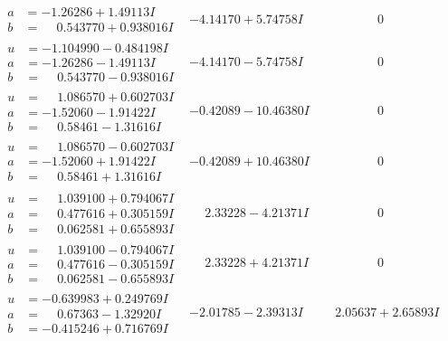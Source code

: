 \documentclass[1p]{elsarticle_modified}
\theoremstyle{definition}
\begin{document}
$$\begin{array}{c|c|c}
\begin{aligned}
a &= -1.26286 + 1.49113 I \\
b &= \phantom{-}0.543770 + 0.938016 I\end{aligned}
 & -4.14170 + 5.74758 I & \phantom{-0.000000 } 0 \\ \hline\begin{aligned}
u &= -1.104990 - 0.484198 I \\
a &= -1.26286 - 1.49113 I \\
b &= \phantom{-}0.543770 - 0.938016 I\end{aligned}
 & -4.14170 - 5.74758 I & \phantom{-0.000000 } 0 \\ \hline\begin{aligned}
u &= \phantom{-}1.086570 + 0.602703 I \\
a &= -1.52060 - 1.91422 I \\
b &= \phantom{-}0.58461 - 1.31616 I\end{aligned}
 & -0.42089 - 10.46380 I & \phantom{-0.000000 } 0 \\ \hline\begin{aligned}
u &= \phantom{-}1.086570 - 0.602703 I \\
a &= -1.52060 + 1.91422 I \\
b &= \phantom{-}0.58461 + 1.31616 I\end{aligned}
 & -0.42089 + 10.46380 I & \phantom{-0.000000 } 0 \\ \hline\begin{aligned}
u &= \phantom{-}1.039100 + 0.794067 I \\
a &= \phantom{-}0.477616 + 0.305159 I \\
b &= \phantom{-}0.062581 + 0.655893 I\end{aligned}
 & \phantom{-}2.33228 - 4.21371 I & \phantom{-0.000000 } 0 \\ \hline\begin{aligned}
u &= \phantom{-}1.039100 - 0.794067 I \\
a &= \phantom{-}0.477616 - 0.305159 I \\
b &= \phantom{-}0.062581 - 0.655893 I\end{aligned}
 & \phantom{-}2.33228 + 4.21371 I & \phantom{-0.000000 } 0 \\ \hline\begin{aligned}
u &= -0.639983 + 0.249769 I \\
a &= \phantom{-}0.67363 - 1.32920 I \\
b &= -0.415246 + 0.716769 I\end{aligned}
 & -2.01785 - 2.39313 I & \phantom{-}2.05637 + 2.65893 I \\ \hline\begin{aligned}

\end{aligned}
\end{array}$$
\end{document}
